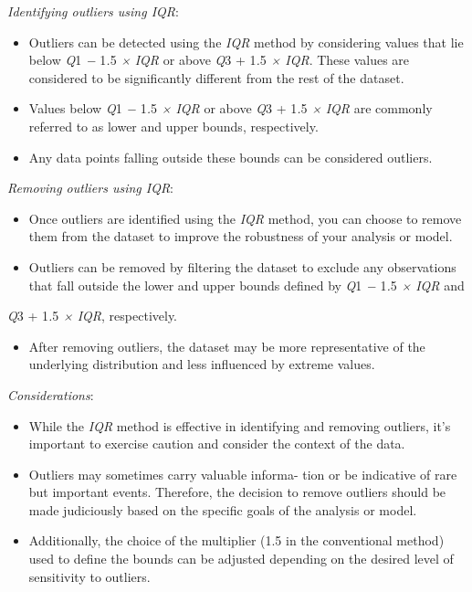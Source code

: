 \begin{multicols}{2}
\emph{Identifying outliers using IQR}:

\begin{itemize}[leftmargin=*]
\item
  Outliers can be detected using the \emph{IQR} method by considering
  values that lie below \emph{Q}1 \emph{−} 1\emph{.}5 \emph{×}
  \emph{IQR} or above \emph{Q}3 + 1\emph{.}5 \emph{× IQR}. These values
  are considered to be significantly different from the rest of the
  dataset.
\item
  Values below \emph{Q}1 \emph{−} 1\emph{.}5 \emph{× IQR} or above
  \emph{Q}3 + 1\emph{.}5 \emph{×} \emph{IQR} are commonly referred to as
  lower and upper bounds, respectively.
\item
  Any data points falling outside these bounds can be considered
  outliers.
\end{itemize}

\emph{Removing outliers using IQR}:

\begin{itemize}[leftmargin=*]
\item
  Once outliers are identified using the \emph{IQR} method, you can
  choose to remove them from the dataset to improve the robustness of
  your analysis or model.
\item
  Outliers can be removed by filtering the dataset to exclude any
  observations that fall outside the lower and upper bounds defined by
  \emph{Q}1 \emph{−} 1\emph{.}5 \emph{× IQR} and
\end{itemize}

\emph{Q}3 + 1\emph{.}5 \emph{× IQR}, respectively.

\begin{itemize}[leftmargin=*]
\item
  After removing outliers, the dataset may be more representative of the
  underlying distribution and less influenced by extreme values.
\end{itemize}

\emph{Considerations}:

\begin{itemize}[leftmargin=*]
\item
  While the \emph{IQR} method is effective in identifying and removing
  outliers, it's important to exercise caution and consider the context
  of the data.
\item
  Outliers may sometimes carry valuable informa- tion or be indicative
  of rare but important events. Therefore, the decision to remove
  outliers should be made judiciously based on the specific goals of the
  analysis or model.
\item
  Additionally, the choice of the multiplier (1.5 in the conventional
  method) used to define the bounds can be adjusted depending on the
  desired level of sensitivity to outliers.
\end{itemize}


\end{multicols}
